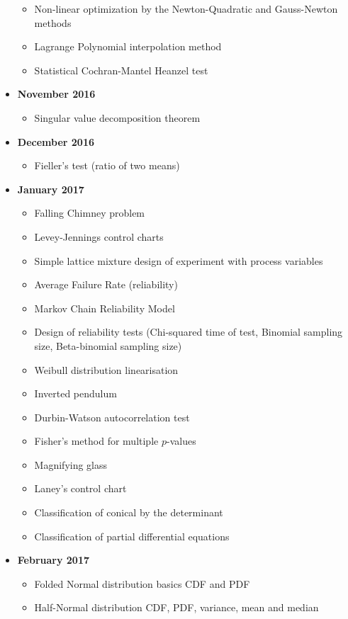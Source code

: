 \documentclass[12pt,a4paper,twoside,openright]{report}
\theoremstyle{definition}
\theoremstyle{itexmp}
\numberwithin{equation}{section}
\begin{document}
\begin{itemize}
\begin{itemize}[noitemsep]
			\item Non-linear optimization by the Newton-Quadratic and Gauss-Newton methods
			\item Lagrange Polynomial interpolation method
			\item Statistical Cochran-Mantel Heanzel test
		\end{itemize}
	\item \textbf{November 2016}
		\begin{itemize}[noitemsep]
			\item Singular value decomposition theorem
		\end{itemize}
	\item \textbf{December 2016}
		\begin{itemize}[noitemsep]
			\item Fieller's test (ratio of two means)
		\end{itemize}
	\item \textbf{January 2017}
		\begin{itemize}[noitemsep]
			\item Falling Chimney problem
			\item Levey-Jennings control charts
			\item Simple lattice mixture design of experiment with process variables
			\item Average Failure Rate (reliability)
			\item Markov Chain Reliability Model
			\item Design of reliability tests (Chi-squared time of test, Binomial sampling size, Beta-binomial sampling size)
			\item Weibull distribution linearisation
			\item Inverted pendulum
			\item Durbin-Watson autocorrelation test
			\item Fisher's method for multiple $p$-values
			\item Magnifying glass
			\item Laney's control chart
			\item Classification of conical by the determinant	
			\item Classification of partial differential equations
		\end{itemize}
	\item \textbf{February 2017}
		\begin{itemize}[noitemsep]
			\item Folded Normal distribution basics CDF and PDF
			\item Half-Normal distribution CDF, PDF, variance, mean and median

\end{itemize}
\end{itemize}
\end{document}
